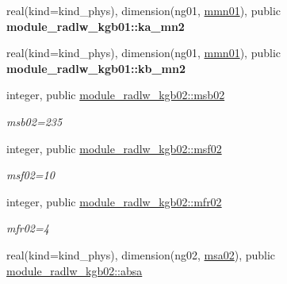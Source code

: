 \begin{DoxyCompactItemize}
\mbox{\label{group__module__radlw__kgbnn_ga0a4f08c625f2f25f132200811af42331}} 
real(kind=kind\+\_\+phys), dimension(ng01, \hyperlink{group__module__radlw__kgbnn_ga218c6844f9043f362571f091a4f80522}{mmn01}), public {\bfseries module\+\_\+radlw\+\_\+kgb01\+::ka\+\_\+mn2}
\item 
\mbox{\label{group__module__radlw__kgbnn_gac357df5f66a7e384e22db58203ac294a}} 
real(kind=kind\+\_\+phys), dimension(ng01, \hyperlink{group__module__radlw__kgbnn_ga218c6844f9043f362571f091a4f80522}{mmn01}), public {\bfseries module\+\_\+radlw\+\_\+kgb01\+::kb\+\_\+mn2}
\item 
\mbox{\label{group__module__radlw__kgbnn_ga03e70b84fd16795104a3fb7b425af70c}} 
integer, public \hyperlink{group__module__radlw__kgbnn_ga03e70b84fd16795104a3fb7b425af70c}{module\+\_\+radlw\+\_\+kgb02\+::msb02}
\begin{DoxyCompactList}\small\item\em msb02=235 \end{DoxyCompactList}\item 
\mbox{\label{group__module__radlw__kgbnn_ga99b728d38d664afc203303563541ab5c}} 
integer, public \hyperlink{group__module__radlw__kgbnn_ga99b728d38d664afc203303563541ab5c}{module\+\_\+radlw\+\_\+kgb02\+::msf02}
\begin{DoxyCompactList}\small\item\em msf02=10 \end{DoxyCompactList}\item 
\mbox{\label{group__module__radlw__kgbnn_ga2973c2e9220e85b74f0b251c896aa837}} 
integer, public \hyperlink{group__module__radlw__kgbnn_ga2973c2e9220e85b74f0b251c896aa837}{module\+\_\+radlw\+\_\+kgb02\+::mfr02}
\begin{DoxyCompactList}\small\item\em mfr02=4 \end{DoxyCompactList}\item 
\mbox{\label{group__module__radlw__kgbnn_ga46db893d4456b2d867130bb208cb2206}} 
real(kind=kind\+\_\+phys), dimension(ng02, \hyperlink{namespacemodule__radlw__kgb02_a370b514d7834ac2a22d245f118882bf4}{msa02}), public \hyperlink{group__module__radlw__kgbnn_ga46db893d4456b2d867130bb208cb2206}{module\+\_\+radlw\+\_\+kgb02\+::absa}

\end{DoxyCompactItemize}
